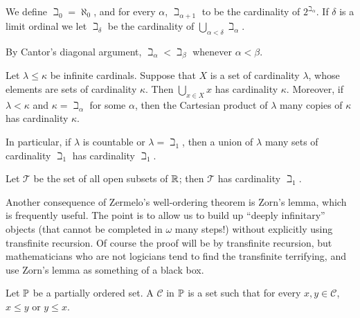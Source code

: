 \begin{definition}\label{beth dfn}
We define $\beth_{0} = \aleph_{0}$, and for every $\alpha$, $\beth_{\alpha + 1}$ to be the cardinality of $2^{\beth_{\alpha}}$.
If $\delta$ is a limit ordinal we let $\beth_{\delta}$ be the cardinality of $\bigcup_{\alpha < \delta} \beth_{\alpha}$.
\end{definition}

\begin{subsec}
By Cantor's diagonal argument, $\beth_{\alpha} < \beth_{\beta}$ whenever $\alpha < \beta$.
\end{subsec}

\begin{theorem}\label{cardinal arithmetic trivial}
Let $\lambda \leq \kappa$ be infinite cardinals.
Suppose that $X$ is a set of cardinality $\lambda$, whose elements are sets of cardinality $\kappa$. Then $\bigcup_{x \in X} x$ has cardinality $\kappa$.
Moreover, if $\lambda < \kappa$ and $\kappa = \beth_{\alpha}$ for some $\alpha$, then the Cartesian product of $\lambda$ many copies of $\kappa$ has cardinality $\kappa$.
\end{theorem}

\begin{subsec}
In particular, if $\lambda$ is countable or $\lambda = \beth_{1}$, then a union of $\lambda$ many sets of cardinality $\beth_{1}$ has cardinality $\beth_{1}$.
\end{subsec}

\begin{theorem}\label{cardinality of topology}
Let $\mathcal T$ be the set of all open subsets of $\mathbb{R}$; then $\mathcal T$ has cardinality $\beth_{1}$.
\end{theorem}

\begin{subsec}
Another consequence of Zermelo's well-ordering theorem is Zorn's lemma, which is frequently useful.
The point is to allow us to build up ``deeply infinitary'' objects (that cannot be completed in $\omega$ many steps!) without explicitly using transfinite recursion.
Of course the proof will be by transfinite recursion, but mathematicians who are not logicians tend to find the transfinite terrifying, and use Zorn's lemma as something of a black box.
\end{subsec}

\begin{definition}
Let $\mathbb{P}$ be a partially ordered set. A  $\mathcal C$ in $\mathbb{P}$ is a set such that for every $x, y \in \mathcal C$, $x \leq y$ or $y \leq x$.
\end{definition}

